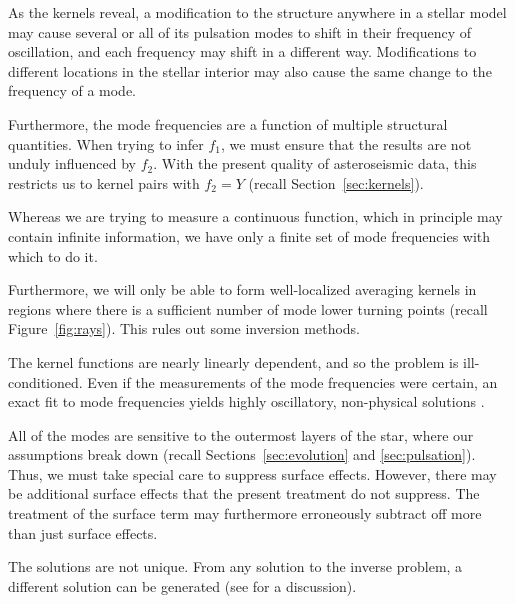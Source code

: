 \begin{description}
    \setlength{\itemindent}{0px}
    \item[Degeneracy.] As the kernels reveal, a modification to the structure anywhere in a stellar model may cause several or all of its pulsation modes to shift in their frequency of oscillation, and each frequency may shift in a different way. 
    Modifications to different locations in the stellar interior may also cause the same change to the frequency of a mode. 
    
    Furthermore, the mode frequencies are a function of multiple structural quantities. 
    When trying to infer $f_1$, we must ensure that the results are not unduly influenced by $f_2$. 
    With the present quality of asteroseismic data, this restricts us to kernel pairs with ${f_2=Y}$ (recall Section~\ref{sec:kernels}). 
    
    \item[Information Content.] 
    Whereas we are trying to measure a continuous function, which in principle may contain infinite information, we have only a finite set of mode frequencies with which to do it. 
    
    Furthermore, we will only be able to form well-localized averaging kernels in regions where there is a sufficient number of mode lower turning points (recall Figure~\ref{fig:rays}). 
    This rules out some inversion methods. 
    
    \item[Stability.]  The kernel functions are nearly linearly dependent, and so the problem is ill-conditioned. 
    Even if the measurements of the mode frequencies were certain, an exact fit to mode frequencies yields highly oscillatory, non-physical solutions \citep[see, e.g.,][]{1990MNRAS.244..542D}. 
    
    \item[Surface Effects.] All of the modes are sensitive to the outermost layers of the star, where our assumptions break down (recall Sections~\ref{sec:evolution} and \ref{sec:pulsation}). 
    Thus, we must take special care to suppress surface effects. 
    However, there may be additional surface effects that the present treatment do not suppress. 
    The treatment of the surface term may furthermore erroneously subtract off more than just surface effects. 
    
    \item[Uniqueness.] The solutions are not unique. 
    From any solution to the inverse problem, a different solution can be generated %
    (see \citealt{GoughThompson1991} for a discussion). 
\end{description}
